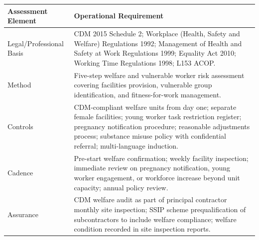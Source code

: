 \begin{table}[H]
\centering
\begin{tabularx}{\textwidth}{>{\raggedright\arraybackslash}p{3.2cm}X}
\toprule
\textbf{Assessment Element} & \textbf{Operational Requirement} \\
\midrule
Legal/Professional Basis & CDM 2015 Schedule 2; Workplace (Health, Safety and Welfare) Regulations 1992; Management of Health and Safety at Work Regulations 1999; Equality Act 2010; Working Time Regulations 1998; L153 ACOP. \\
Method & Five-step welfare and vulnerable worker risk assessment covering facilities provision, vulnerable group identification, and fitness-for-work management. \\
Controls & CDM-compliant welfare units from day one; separate female facilities; young worker task restriction register; pregnancy notification procedure; reasonable adjustments process; substance misuse policy with confidential referral; multi-language induction. \\
Cadence & Pre-start welfare confirmation; weekly facility inspection; immediate review on pregnancy notification, young worker engagement, or workforce increase beyond unit capacity; annual policy review. \\
Assurance & CDM welfare audit as part of principal contractor monthly site inspection; SSIP scheme prequalification of subcontractors to include welfare compliance; welfare condition recorded in site inspection reports. \\
\bottomrule
\end{tabularx}
\end{table}

